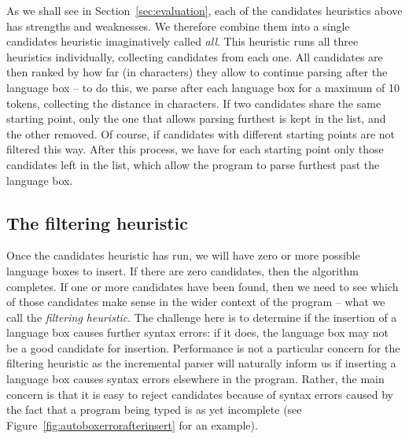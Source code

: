 \documentclass[sigplan,screen]{acmart}\settopmatter{printfolios=true,printccs=false,printacmref=false}
\begin{document}
As we shall see in Section~\ref{sec:evaluation}, each of the candidates
heuristics above has strengths and weaknesses. We therefore combine them into a
single candidates heuristic imaginatively called \emph{all}.
This heuristic runs all three heuristics individually, collecting candidates from
each one.
All candidates are then ranked by how far (in characters) they allow to
continue parsing after the language box -- to do this, we parse after each
language box for a maximum of 10 tokens, collecting the distance in characters.
If two candidates share the same starting point, only the one that allows
parsing furthest is kept in the list, and the other removed. Of course, if
candidates with different starting points are not filtered this way. After this
process, we have for each starting point only those candidates left in the
list, which allow the program to parse furthest past the language box.


\subsection{The filtering heuristic}
\label{sec:filtering}

Once the candidates heuristic has run, we will have zero or more possible
language boxes to insert. If there are zero candidates, then the algorithm
completes. If one or more candidates have been found, then we need to see
which of those candidates make sense in the wider context of the program --
what we call the \emph{filtering heuristic}. The challenge here is to determine
if the insertion of a language box causes further syntax errors: if it does,
the language box may not be a good candidate for insertion. Performance is
not a particular concern for the filtering heuristic as the incremental
parser will naturally inform us if inserting a language box causes syntax
errors elsewhere in the program. Rather, the main concern is that it is easy to
reject candidates because of syntax errors caused by the fact that a program
being typed is as yet incomplete (see Figure~\ref{fig:autoboxerrorafterinsert}
for an example).
\end{document}
